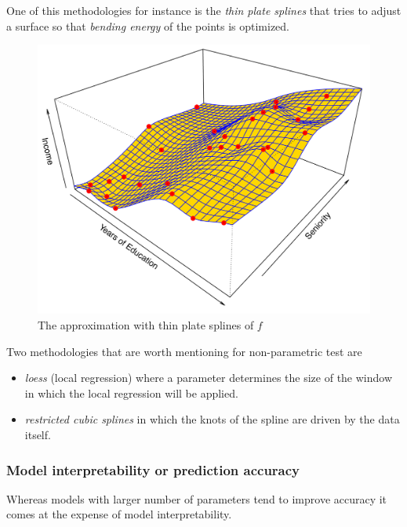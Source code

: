 \documentclass[11pt]{article}
\makeatletter
\def\maxwidth{\ifdim\Gin@nat@width>\linewidth\linewidth
    \else\Gin@nat@width\fi}
\let\Oldincludegraphics\includegraphics
\renewcommand{\includegraphics}[1]{\Oldincludegraphics[width=.8\maxwidth]{#1}}
\providecommand{\tightlist}{%
      \setlength{\itemsep}{0pt}\setlength{\parskip}{0pt}}
\makeatother
\begin{document}
One of this methodologies for instance is the \emph{thin plate splines}
that tries to adjust a surface so that \emph{bending energy} of the
points is optimized.

\begin{figure}[h!]
    \centering
    \includegraphics{2.6.png}
    \caption{The approximation with thin plate splines of $f$}
\end{figure}

Two methodologies that are worth mentioning for non-parametric test are

\begin{itemize}
\tightlist
\item
  \emph{loess} (local regression) where a parameter determines the size
  of the window in which the local regression will be applied.
\item
  \emph{restricted cubic splines} in which the knots of the spline are
  driven by the data itself.
\end{itemize}

    \hypertarget{model-interpretability-or-prediction-accuracy}{%
\subsubsection{Model interpretability or prediction
accuracy}\label{model-interpretability-or-prediction-accuracy}}

Whereas models with larger number of parameters tend to improve accuracy
it comes at the expense of model interpretability.
\end{document}
